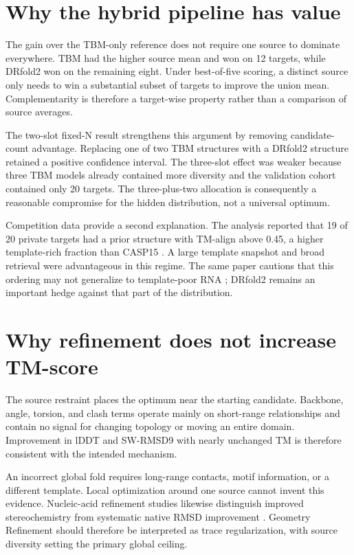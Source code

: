 \documentclass[12pt,a4paper,oneside]{report}
\begin{document}
\section{Why the hybrid pipeline has value}

The gain over the TBM-only reference does not require one source to dominate everywhere.
TBM had the higher source mean and won on 12 targets, while DRfold2 won on the remaining
eight. Under best-of-five scoring, a distinct source only needs to win a substantial
subset of targets to improve the union mean. Complementarity is therefore a target-wise
property rather than a comparison of source averages.

The two-slot fixed-N result strengthens this argument by removing candidate-count
advantage. Replacing one of two TBM structures with a DRfold2 structure retained a
positive confidence interval. The three-slot effect was weaker because three TBM models
already contained more diversity and the validation cohort contained only 20 targets.
The three-plus-two allocation is consequently a reasonable compromise for the hidden
distribution, not a universal optimum.

Competition data provide a second explanation. The analysis reported that 19 of 20
private targets had a prior structure with TM-align above 0.45, a higher template-rich
fraction than CASP15 \cite{competition_paper}. A large template snapshot and broad
retrieval were advantageous in this regime. The same paper cautions that this ordering
may not generalize to template-poor RNA \cite{competition_paper}; DRfold2 remains an
important hedge against that part of the distribution.

\section{Why refinement does not increase TM-score}

The source restraint places the optimum near the starting candidate. Backbone, angle,
torsion, and clash terms operate mainly on short-range relationships and contain no
signal for changing topology or moving an entire domain. Improvement in lDDT and
SW-RMSD9 with nearly unchanged TM is therefore consistent with the intended mechanism.

An incorrect global fold requires long-range contacts, motif information, or a different
template. Local optimization around one source cannot invent this evidence. Nucleic-acid
refinement studies likewise distinguish improved stereochemistry from systematic native
RMSD improvement \cite{qrnas}. Geometry Refinement should therefore be interpreted as
trace regularization, with source diversity setting the primary global ceiling.
\end{document}
